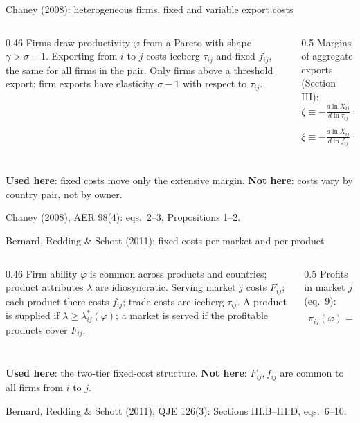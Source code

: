 \documentclass[notes,11pt, aspectratio=169]{beamer}
\newcommand{\src}[1]{\par\vfill{\scriptsize\color{gray}#1\par}}
\begin{document}
\begin{frame}[label=app-chaney]{Chaney (2008): heterogeneous firms, fixed and variable export costs}
\begin{columns}[T]
\begin{column}{0.46\textwidth}
\small
Firms draw productivity $\varphi$ from a Pareto with shape $\gamma>\sigma-1$. Exporting from $i$ to $j$ costs iceberg $\tau_{ij}$ and fixed $f_{ij}$, the same for all firms in the pair. Only firms above a threshold export; firm exports have elasticity $\sigma-1$ with respect to $\tau_{ij}$.
\end{column}
\begin{column}{0.5\textwidth}
\footnotesize
Margins of aggregate exports (Section III):
\[
\zeta\equiv-\tfrac{d\ln X_{ij}}{d\ln\tau_{ij}}=\underbrace{\sigma-1}_{\text{int.}}+\underbrace{\gamma-(\sigma-1)}_{\text{ext.}}=\gamma
\]
\[
\xi\equiv-\tfrac{d\ln X_{ij}}{d\ln f_{ij}}=\underbrace{0}_{\text{int.}}+\underbrace{\tfrac{\gamma}{\sigma-1}-1}_{\text{ext.}}
\]
\end{column}
\end{columns}
\small
\textbf{Used here}: fixed costs move only the extensive margin. \textbf{Not here}: costs vary by country pair, not by owner.
\src{Chaney (2008), AER 98(4): eqs.\ 2--3, Propositions 1--2. \hyperlink{compare}{\beamerreturnbutton{Back}}}
\end{frame}


\begin{frame}[label=app-brs]{Bernard, Redding \& Schott (2011): fixed costs per market and per product}
\begin{columns}[T]
\begin{column}{0.46\textwidth}
\small
Firm ability $\varphi$ is common across products and countries; product attributes $\lambda$ are idiosyncratic. Serving market $j$ costs $F_{ij}$; each product there costs $f_{ij}$; trade costs are iceberg $\tau_{ij}$. A product is supplied if $\lambda\ge\lambda^*_{ij}(\varphi)$; a market is served if the profitable products cover $F_{ij}$.
\end{column}
\begin{column}{0.5\textwidth}
\footnotesize
Profits in market $j$ (eq.\ 9):
\begin{align*}
\pi_{ij}(\varphi)=&\int_{\lambda^*_{ij}(\varphi)}^{\infty}\Big(\tfrac{r_{ij}(\varphi,\lambda)}{\sigma}-w_if_{ij}\Big)z(\lambda)\,d\lambda\\
&-\,w_iF_{ij}
\end{align*}
\end{column}
\end{columns}
\small
\textbf{Used here}: the two-tier fixed-cost structure. \textbf{Not here}: $F_{ij},f_{ij}$ are common to all firms from $i$ to $j$.
\src{Bernard, Redding \& Schott (2011), QJE 126(3): Sections III.B--III.D, eqs.\ 6--10. \hyperlink{compare}{\beamerreturnbutton{Back}}}
\end{frame}
\end{document}
